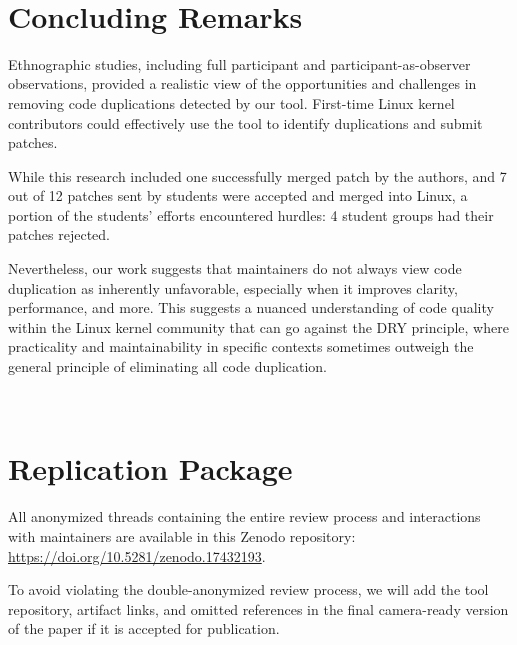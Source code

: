 \documentclass[10pt,conference]{IEEEtran}
\begin{document}
\hfill\\

\section{Concluding Remarks}

Ethnographic studies, including full participant and participant-as-observer observations, provided a realistic view of the opportunities and challenges in removing code duplications detected by our tool. First-time Linux kernel contributors could effectively use the tool to identify duplications and submit patches.

While this research included one successfully merged patch by the authors, and 7 out of 12 patches sent by students were accepted and merged into Linux, a portion of the students' efforts encountered hurdles: 4 student groups had their patches rejected.

Nevertheless, our work suggests that maintainers do not always view code duplication as inherently unfavorable, especially when it improves clarity, performance, and more. This suggests a nuanced understanding of code quality within the Linux kernel community that can go against the DRY principle, where practicality and maintainability in specific contexts sometimes outweigh the general principle of eliminating all code duplication.

\hfill\\

\section*{Replication Package}

All anonymized threads containing the entire review process and interactions with maintainers are available in this Zenodo repository: \href{https://doi.org/10.5281/zenodo.17432193}{https://doi.org/10.5281/zenodo.17432193}.


To avoid violating the double-anonymized review process, we will add the tool repository, artifact links, and omitted references in the final camera-ready version of the paper if it is accepted for publication.




\end{document}
